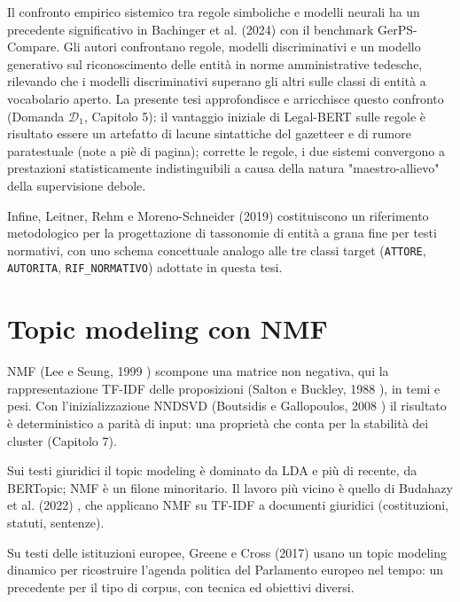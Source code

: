 \documentclass[12pt,a4paper,oneside]{report}
\begin{document}
Il confronto empirico sistemico tra regole simboliche e modelli neurali ha un precedente significativo in Bachinger et al. (2024) \cite{bachinger2024gerps} con il benchmark GerPS-Compare. Gli autori confrontano regole, modelli discriminativi e un modello generativo sul riconoscimento delle entità in norme amministrative tedesche, rilevando che i modelli discriminativi superano gli altri sulle classi di entità a vocabolario aperto. La presente tesi approfondisce e arricchisce questo confronto (Domanda $\mathcal{D}_1$, Capitolo 5): il vantaggio iniziale di Legal-BERT sulle regole è risultato essere un artefatto di lacune sintattiche del gazetteer e di rumore paratestuale (note a piè di pagina); corrette le regole, i due sistemi convergono a prestazioni statisticamente indistinguibili a causa della natura "maestro-allievo" della supervisione debole.

Infine, Leitner, Rehm e Moreno-Schneider (2019) \cite{leitner2019finegrained} costituiscono un riferimento metodologico per la progettazione di tassonomie di entità a grana fine per testi normativi, con uno schema concettuale analogo alle tre classi target (\texttt{ATTORE}, \texttt{AUTORITA}, \texttt{RIF\_NORMATIVO}) adottate in questa tesi.



\section{Topic modeling con NMF}
NMF (Lee e Seung, 1999 \cite{lee1999nmf}) scompone una matrice non negativa, qui la rappresentazione TF-IDF delle proposizioni (Salton e Buckley, 1988 \cite{salton1988termweighting}), in temi e pesi. Con l'inizializzazione NNDSVD (Boutsidis e Gallopoulos, 2008 \cite{boutsidis2008nndsvd}) il risultato è deterministico a parità di input: una proprietà che conta per la stabilità dei cluster (Capitolo 7).

Sui testi giuridici il topic modeling è dominato da LDA e più di recente, da BERTopic; NMF è un filone minoritario. Il lavoro più vicino è quello di Budahazy et al. (2022) \cite{budahazy2022nmf}, che applicano NMF su TF-IDF a documenti giuridici (costituzioni, statuti, sentenze).

Su testi delle istituzioni europee, Greene e Cross (2017) \cite{greene2017political} usano un topic modeling dinamico per ricostruire l'agenda politica del Parlamento europeo nel tempo: un precedente per il tipo di corpus, con tecnica ed obiettivi diversi.
\end{document}
